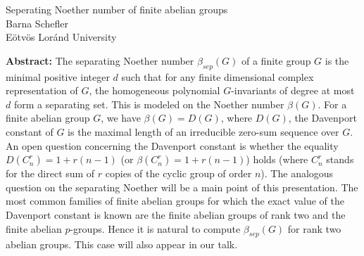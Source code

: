 \documentclass[12pt,a4paper]{article}
\begin{document}
\thispagestyle{empty} 
\begin{center}
{\large  Seperating Noether number of finite abelian groups}\\
\vspace*{.5cm}
Barna Schefler\\
Eötvös Loránd University\\
\end{center}
\vspace*{.8cm}

{\bf Abstract:} The separating Noether number $\beta_{sep}(G)$ of a finite group $G$ is the minimal positive integer $d$ such that for any finite dimensional complex representation of $G$, the homogeneous polynomial $G$-invariants of degree at most $d$ form a separating set. This is modeled on the Noether number $\beta(G)$. For a finite abelian group $G$, we have $\beta(G) = D(G)$, where $D(G)$, the Davenport constant of $G$ is the maximal length of an irreducible zero-sum sequence over $G$. An open question concerning the Davenport constant is whether the equality $D(C_n^r) = 1 + r(n-1)$ (or $\beta(C_n^r) = 1 + r(n-1)$) holds (where $C_n^r$ stands for the
direct sum of $r$ copies of the cyclic group of order $n$). The analogous question on the separating Noether will be a main point of this presentation. The most common families of finite abelian groups for which the exact value of the Davenport constant is known are the finite abelian groups of rank two and the finite abelian $p$-groups. Hence it is natural to compute $\beta_{sep}(G)$ for rank two abelian
groups. This case will also appear in our talk.

											
\end{document}
